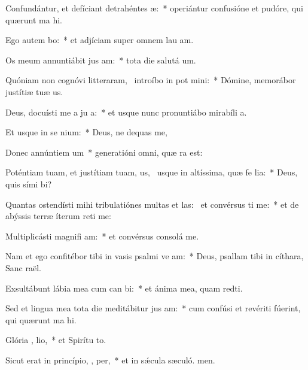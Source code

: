 \item Confundántur, et defíciant detrahéntes  æ:~* operiántur confusióne et pudóre, qui quærunt ma hi.
\item Ego autem  bo:~* et adjíciam super omnem lau am.
\item Os meum annuntiábit jus am:~* tota die salutá um.
\item Quóniam non cognóvi litteraram,~\pscross{} introíbo in pot mini:~* Dómine, memorábor justítiæ tuæ us.
\item Deus, docuísti me a ju a:~* et usque nunc pronuntiábo mirabíli a.
\item Et usque in se  nium:~* Deus, ne dequas me,
\item Donec annúntiem  um~* generatióni omni, quæ ra est:
\item Poténtiam tuam, et justítiam tuam, us,~\pscross{} usque in altíssima, quæ fe lia:~* Deus, quis sími bi?
\item Quantas ostendísti mihi tribulatiónes multas et las:~\pscross{} et convérsus ti me:~* et de abýssis terræ íterum reti me:
\item Multiplicásti magnifi am:~* et convérsus consolá  me.
\item Nam et ego confitébor tibi in vasis psalmi ve am:~* Deus, psallam tibi in cíthara, Sanc raël.
\item Exsultábunt lábia mea cum can bi:~* et ánima mea, quam redti.
\item Sed et lingua mea tota die meditábitur jus am:~* cum confúsi et revériti fúerint, qui quærunt ma hi.
\item Glória ,  lio,~* et Spirítu to.
\item Sicut erat in princípio,  ,  per,~* et in sǽcula sæculó. men.
